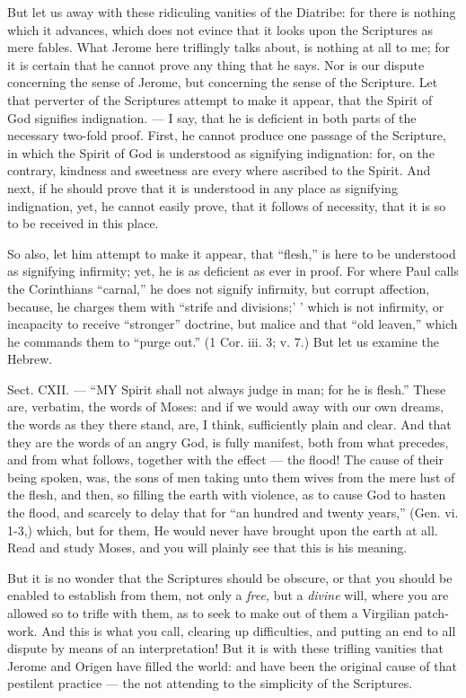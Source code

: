 But let us away with these ridiculing vanities of the Diatribe: for there is nothing which it advances, which does not evince that it looks upon the Scriptures as mere fables. What Jerome here triflingly talks about, is nothing at all to me; for it is certain that he cannot prove any thing that he says. Nor is our dispute concerning the sense of Jerome, but concerning the sense of the Scripture. Let that perverter of the Scriptures attempt to make it appear, that the Spirit of God signifies indignation. — I say, that he is deficient in both parts of the necessary two-fold proof. First, he cannot produce one passage of the Scripture, in which the Spirit of God is understood as signifying indignation: for, on the contrary, kindness and sweetness are every where ascribed to the Spirit. And next, if he should prove that it is understood in any place as signifying indignation, yet, he cannot easily prove, that it follows of necessity, that it is so to be received in this place.

So also, let him attempt to make it appear, that “flesh,” is here to be understood as signifying infirmity; yet, he is as deficient as ever in proof. For where Paul calls the Corinthians “carnal,” he does not signify infirmity, but corrupt affection, because, he charges them with “strife and divisions;’ ’ which is not infirmity, or incapacity to receive “stronger” doctrine, but malice and that “old leaven,” which he commands them to “purge out.” (1 Cor. iii. 3; v. 7.) But let us examine the Hebrew.


Sect. CXII. — “MY Spirit shall not always judge in man; for he is flesh.” These are, verbatim, the words of Moses: and if we would away with our own dreams, the words as they there stand, are, I think, sufficiently plain and clear. And that they are the words of an angry God, is fully manifest, both from what precedes, and from what follows, together with the effect — the flood! The cause of their being spoken, was, the sons of men taking unto them wives from the mere lust of the flesh, and then, so filling the earth with violence, as to cause God to hasten the flood, and scarcely to delay that for “an hundred and twenty years,” (Gen. vi. 1-3,) which, but for them, He would never have brought upon the earth at all. Read and study Moses, and you will plainly see that this is his meaning.

But it is no wonder that the Scriptures should be obscure, or that you should be enabled to establish from them, not only a \emph{free, }but a \emph{divine }will, where you are allowed so to trifle with them, as to seek to make out of them a Virgilian patch-work. And this is what you call, clearing up difficulties, and putting an end to all dispute by means of an interpretation! But it is with these trifling vanities that Jerome and Origen have filled the world: and have been the original cause of that pestilent practice — the not attending to the simplicity of the Scriptures.

